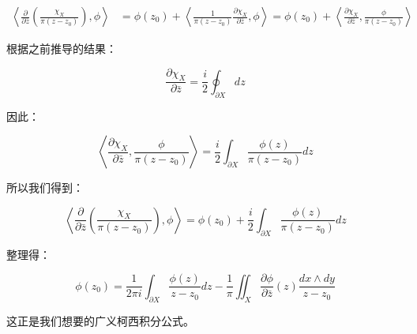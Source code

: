 $$
\begin{aligned}
\left\langle \frac{\partial}{\partial \bar{z}}\left( \frac{\chi_X}{\pi(z - z_0)} \right), \phi \right\rangle 
&= \phi(z_0) + \left\langle \frac{1}{\pi(z - z_0)} \frac{\partial \chi_X}{\partial \bar{z}}, \phi \right\rangle

= \phi(z_0) + \left\langle \frac{\partial \chi_X}{\partial \bar{z}}, \frac{\phi}{\pi(z - z_0)} \right\rangle
\end{aligned}

$$

根据之前推导的结果：

$$
\frac{\partial \chi_X}{\partial \bar{z}} = \frac{i}{2} \oint_{\partial X} dz
$$

因此：

$$
\left\langle \frac{\partial \chi_X}{\partial \bar{z}}, \frac{\phi}{\pi(z - z_0)} \right\rangle = \frac{i}{2} \int_{\partial X} \frac{\phi(z)}{\pi(z - z_0)} dz
$$

所以我们得到：

$$
\left\langle \frac{\partial}{\partial \bar{z}}\left( \frac{\chi_X}{\pi(z - z_0)} \right), \phi \right\rangle = \phi(z_0) + \frac{i}{2} \int_{\partial X} \frac{\phi(z)}{\pi(z - z_0)} dz
$$

整理得：

$$
\phi(z_0) = \frac{1}{2\pi i} \int_{\partial X} \frac{\phi(z)}{z - z_0} dz - \frac{1}{\pi} \iint_X \frac{\partial \phi}{\partial \bar{z}}(z) \frac{dx \wedge dy}{z - z_0}
$$

这正是我们想要的广义柯西积分公式。
